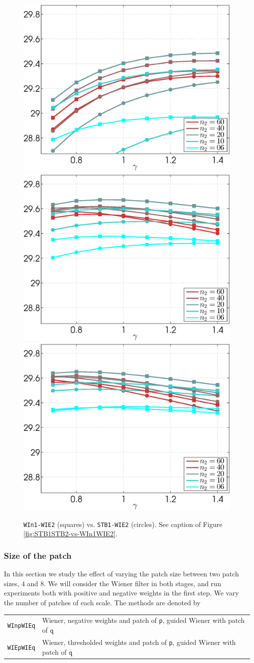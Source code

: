 \documentclass{ipol}
\begin{document}
\begin{figure}[ht!]
	\includegraphics[width=.33\textwidth]{f/nldct/STB1WIE2-vs-WIn1WIE2_fpsnr_np2-g-curves_1np010_s40_average.eps}%
	\includegraphics[width=.33\textwidth]{f/nldct/STB1WIE2-vs-WIn1WIE2_fpsnr_np2-g-curves_1np040_s40_average.eps}%
	\includegraphics[width=.33\textwidth]{f/nldct/STB1WIE2-vs-WIn1WIE2_fpsnr_np2-g-curves_1np100_s40_average.eps}\\
	\caption{\texttt{WIn1-WIE2} (squares) vs. \texttt{STB1-WIE2} (circles). See
	caption of Figure \ref{fig:STB1STB2-vs-WIn1WIE2}.}
	\label{fig:STB1WIE2-vs-WIn1WIE2}
\end{figure}

\clearpage

\subsubsection{Size of the patch}

In this section we study the effect of varying the patch size between two
patch sizes, $4$ and $8$. We will consider the Wiener filter in both stages,
and run experiments both with positive and negative weights in the first step.
We vary the number of patches of each scale.
The methods are denoted by
\begin{center}
	\begin{tabular}{l l}
	\texttt{WInpWIEq}& Wiener, negative weights and patch of \texttt{p},
	                  guided Wiener with patch of $\texttt{q}$\\
	\texttt{WIEpWIEq}& Wiener, thresholded weights and patch of \texttt{p},
	                  guided Wiener with patch of $\texttt{q}$\\
\end{tabular}
\end{center}
\end{document}
